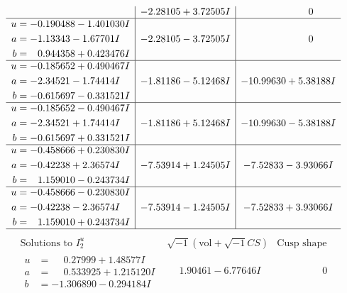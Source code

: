 \documentclass[1p]{elsarticle_modified}
\theoremstyle{definition}
\newcommand{\I}{\sqrt{-1}}
\begin{document}
$$\begin{array}{c|c|c}
 & -2.28105 + 3.72505 I & \phantom{-0.000000 } 0 \\ \hline\begin{aligned}
u &= -0.190488 - 1.401030 I \\
a &= -1.13343 - 1.67701 I \\
b &= \phantom{-}0.944358 + 0.423476 I\end{aligned}
 & -2.28105 - 3.72505 I & \phantom{-0.000000 } 0 \\ \hline\begin{aligned}
u &= -0.185652 + 0.490467 I \\
a &= -2.34521 - 1.74414 I \\
b &= -0.615697 - 0.331521 I\end{aligned}
 & -1.81186 - 5.12468 I & -10.99630 + 5.38188 I \\ \hline\begin{aligned}
u &= -0.185652 - 0.490467 I \\
a &= -2.34521 + 1.74414 I \\
b &= -0.615697 + 0.331521 I\end{aligned}
 & -1.81186 + 5.12468 I & -10.99630 - 5.38188 I \\ \hline\begin{aligned}
u &= -0.458666 + 0.230830 I \\
a &= -0.42238 + 2.36574 I \\
b &= \phantom{-}1.159010 - 0.243734 I\end{aligned}
 & -7.53914 + 1.24505 I & -7.52833 - 3.93066 I \\ \hline\begin{aligned}
u &= -0.458666 - 0.230830 I \\
a &= -0.42238 - 2.36574 I \\
b &= \phantom{-}1.159010 + 0.243734 I\end{aligned}
 & -7.53914 - 1.24505 I & -7.52833 + 3.93066 I\\
 \hline 
 \end{array}$$\newpage$$\begin{array}{c|c|c}  
\text{Solutions to }I^u_{2}& \I (\text{vol} + \sqrt{-1}CS) & \text{Cusp shape}\\
 \hline 
\begin{aligned}
u &= \phantom{-}0.27999 + 1.48577 I \\
a &= \phantom{-}0.533925 + 1.215120 I \\
b &= -1.306890 - 0.294184 I\end{aligned}
 & \phantom{-}1.90461 - 6.77646 I & \phantom{-0.000000 } 0 \\ \hline\begin{aligned}

\end{aligned}
\end{array}$$
\end{document}
